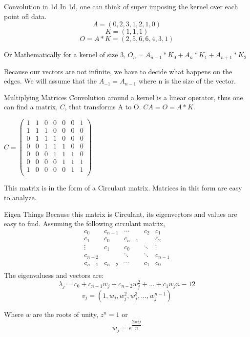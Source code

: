 \documentclass{beamer}
\begin{document}
\begin{frame} {Convolution in 1d}
In 1d, one can think of super imposing the kernel over each point ofl data.
$$A = (0,2,3,1,2,1,0)$$
$$K = (1,1,1)$$ 
$$O = A*K = (2,5,6,6,4,3,1)$$

Or Mathematically for a kernel of size 3, $O_n = A_{n-1}*K_{0}+A_{n}*K_{1}+A_{n+1}*K_{2}$

Because our vectors are not infinite, we have to decide what happens on the edges. We will assume that the $A_{-1} = A_{n-1}$ where n is the size of the vector.
\end{frame}


\begin{frame}{Multiplying Matrices}
Convolution around a kernel is a linear operator, thus one can find a matrix, $C$, that transforms A to O. $CA=O=A*K$.

$C = \begin{pmatrix}
	1 & 1 & 0 & 0 & 0 & 0 & 1\\
	1 & 1 & 1 & 0 & 0 & 0 & 0\\
	0 & 1 & 1 & 1 & 0 & 0 & 0\\
	0 & 0 & 1 & 1 & 1 & 0 & 0\\
	0 & 0 & 0 & 1 & 1 & 1 & 0\\
	0 & 0 & 0 & 0 & 1 & 1 & 1\\
	1 & 0 & 0 & 0 & 0 & 1 & 1\\
\end{pmatrix}$

This matrix is in the form of a Circulant matrix. Matrices in this form are easy to analyze.

\end{frame}


\begin{frame}{Eigen Things}
Because this matrix is Circulant, its eigenvectors and values are easy to find. 
Assuming the following circulant matrix, 
$$\begin{matrix}
	c_0 & c_{n-1} & \cdots & c_2 & c_1\\
	c_1 & c_0 & c_{n-1} &  & c_2\\
	\vdots & c_1 & c_0 & \ddots & \vdots\\
	c_{n-2} &   & \ddots & \ddots & c_{n-1}\\
	c_{n-1} & c_{n-2} & \cdots & c_1 & c_0\\
\end{matrix}$$
The eigenvaluess and vectors are:
$$\lambda_j =c_0+c_{n-1}w_j	+c_{n-2}w_j^2+...+c_{1}w_j{n-1}2$$
$$v_j = (1, w_j, w_j^2, w_j^3, ..., w_j^{n-1})$$

Where $w$ are the roots of unity, $z^n = 1$ or 
$$w_j = e^{\dfrac{2\pi i j}{n}}$$

\end{frame}
\end{document}
